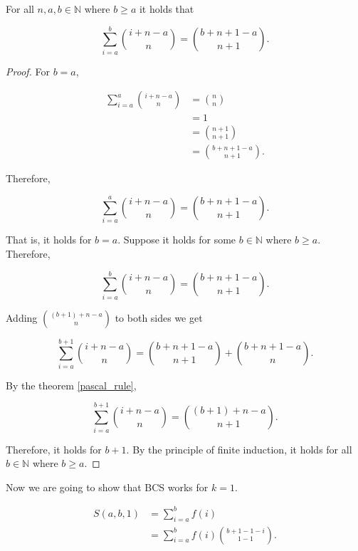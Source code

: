 \documentclass[12pt]{article}
\begin{document}
\vspace{20px}

\begin{theorem} 
    \label{hockey_stick_identity}

    For all $n, a, b \in \mathbb{N}$ where $b \geq a$ it holds that

    $$
        \sum_{i=a}^{b} \binom{i+n-a}{n} = \binom{b+n+1-a}{n+1}.
    $$

\end{theorem}

\begin{proof}

    For $b = a$,


    \begin{align*}
        \sum_{i=a}^{a} \binom{i+n-a}{n} & = \binom{n}{n}          \\
                                        & = 1                     \\
                                        & = \binom{n+1}{n+1}      \\
                                        & = \binom{b+n+1-a}{n+1}.
    \end{align*}

    Therefore,

    $$
        \sum_{i=a}^{a} \binom{i+n-a}{n} = \binom{b+n+1-a}{n+1}.
    $$

    That is, it holds for $b = a$. Suppose it holds for some $b \in \mathbb{N}$ where $b \geq a$. Therefore,


    $$
        \sum_{i=a}^{b} \binom{i+n-a}{n} = \binom{b+n+1-a}{n+1}.
    $$

    Adding $\displaystyle\binom{(b+1)+n-a}{n}$ to both sides we get

    $$
        \sum_{i=a}^{b+1} \binom{i+n-a}{n} = \binom{b+n+1-a}{n+1} + \binom{b+n+1-a}{n}.
    $$

    By the theorem \ref{pascal_rule},

    $$
        \boxed{\sum_{i=a}^{b+1} \binom{i+n-a}{n} = \binom{(b+1)+n-a}{n+1}}.
    $$

    Therefore, it holds for $b + 1$. By the principle of finite induction, it holds for all $b \in \mathbb{N}$ where $b \geq a$.

\end{proof}

Now we are going to show that BCS works for $k = 1$.

\begin{align*}
    S(a, b, 1) & = \sum_{i = a}^{b} f(i) \\
    & = \sum_{i = a}^{b} f(i) \binom{b + 1 - 1 - i}{1 - 1}.
\end{align*}
\end{document}
